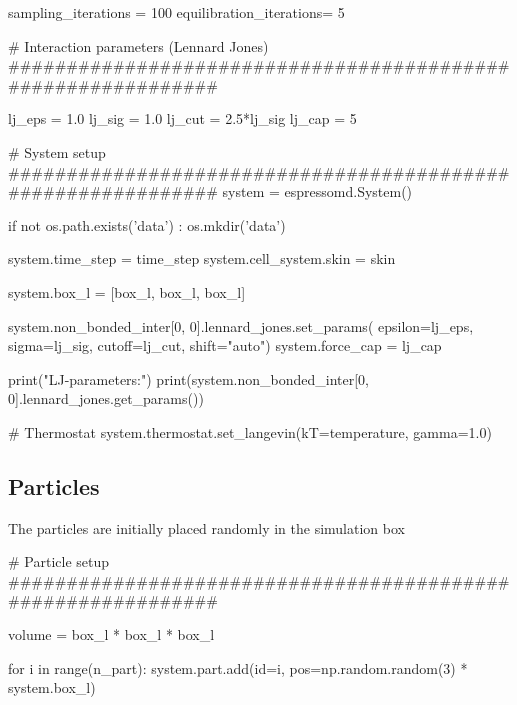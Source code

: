 \documentclass[
paper=a4,                       %
fontsize=11pt,                  %
twoside,                        %
footsepline,                    %
headsepline,                    %
headinclude=false,              %
footinclude=false,              %
pagesize,                       %
]{scrartcl}
\newtheorem{task}{Task}
\begin{document}
{{\begin{pypresso}
sampling_iterations     = 100
equilibration_iterations= 5 


# Interaction parameters (Lennard Jones)
#############################################################

lj_eps = 1.0
lj_sig = 1.0
lj_cut = 2.5*lj_sig
lj_cap = 5 


# System setup
#############################################################
system              = espressomd.System()

if not os.path.exists('data') :
    os.mkdir('data')

system.time_step    = time_step
system.cell_system.skin         = skin

system.box_l = [box_l, box_l, box_l]

system.non_bonded_inter[0, 0].lennard_jones.set_params(
    epsilon=lj_eps, sigma=lj_sig,
    cutoff=lj_cut, shift="auto")
system.force_cap = lj_cap

print("LJ-parameters:")
print(system.non_bonded_inter[0, 0].lennard_jones.get_params())

# Thermostat
system.thermostat.set_langevin(kT=temperature, gamma=1.0)
\end{pypresso}


\subsection{Particles}
The particles are initially placed randomly in the simulation box

\begin{pypresso}
# Particle setup
#############################################################

volume = box_l * box_l * box_l

for i in range(n_part):
    system.part.add(id=i, pos=np.random.random(3) * system.box_l)
\end{pypresso}}\vspace{0,2cm}

   \vspace{1cm}}
\end{document}
